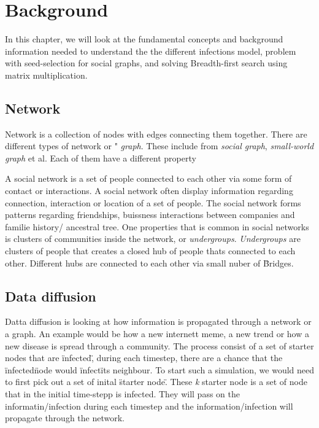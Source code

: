 \chapter{Background} 

In this chapter, we will look at the fundamental concepts and background information needed to understand the the different infections model, problem with seed-selection for social graphs, and solving Breadth-first search using matrix multiplication.

\section{Network}
Network is a collection of nodes with edges connecting them together\cite{TheStrucandcomplex}. There are different types of network or " {\it graph}. These include from {\it social graph}, {\it small-world graph} et al. Each of them have a different property 

A social network is a set of people connected to each other via some form of contact or interactions. A social network often display information regarding connection, interaction or location of a set of people. The social network forms patterns regarding friendships, buissness interactions between companies and familie history/ ancestral tree. One properties that is common in social networks is clusters of communities inside the network, or {\it undergroups}. {\it Undergroups} are clusters of people that creates a closed hub of people thats connected to each other. Different hubs are connected to each other via small nuber of \" Bridges\" \cite{MaxSpread}.  


\section{Data diffusion}
Datta diffusion is looking at how information is propagated through a network or a graph. An example would be how a new internett meme, a new trend or how a new disease is spread through a community. The process consist of a set of starter nodes that are \"infected\", during each timestep, there are a chance that the \"infected\" node would \"infect\" its neighbour. To start such a simulation, we would need to first pick out a set of inital \"starter node\". These {\it k} starter node is a set of node that in the initial time-stepp is infected. They will pass on the informatin/infection during each timestep and the information/infection will propagate through the network.

